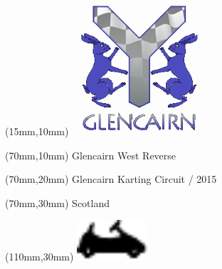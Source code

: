 \null\newpage
\begin{textblock*}{50mm}(15mm,10mm)%
\includegraphics[width=50mm]{LG/GLE.png}
\end{textblock*}
\begin{textblock*}{130mm}(70mm,10mm)%
{\fontsize{20}{20}\selectfont Glencairn West Reverse}\\
\end{textblock*}
\begin{textblock*}{120mm}(70mm,20mm)%
{\fontsize{16}{16}\selectfont Glencairn Karting Circuit / 2015}\\
\end{textblock*}
\begin{textblock*}{120mm}(70mm,30mm)%
{\fontsize{12}{12}\selectfont Scotland}
\end{textblock*}
\begin{textblock*}{30mm}(110mm,30mm)%
\centering
\includegraphics[height=15mm]{icons/kart.pdf}
\end{textblock*}
